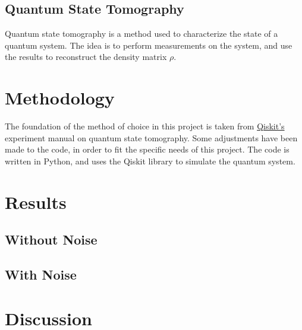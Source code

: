 \documentclass[a4paper,12pt]{article}
\begin{document}
\subsection{Quantum State Tomography}
Quantum state tomography is a method used to characterize the state of a quantum system. The idea is to perform measurements on the system, and use the results to reconstruct the density matrix $\rho$.
\section{Methodology}
The foundation of the method of choice in this project is taken from \href{https://qiskit-community.github.io/qiskit-experiments/manuals/verification/state_tomography.html}{Qiskit's} experiment manual on quantum state tomography. Some adjustments have been made to the code, in order to fit the specific needs of this project. The code is written in Python, and uses the Qiskit library to simulate the quantum system.
\section{Results}
\subsection{Without Noise}
\subsection{With Noise}
\section{Discussion}

\newpage
\thispagestyle{empty}
\printbibliography
\end{document}
